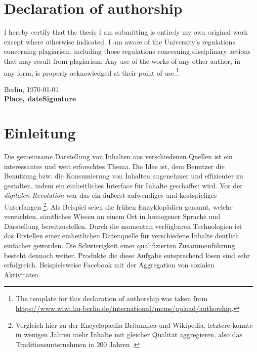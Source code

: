 \documentclass[12pt,twoside]{book}
\let\cleardoublepage\clearpage
\newcommand\blankpage{%
    \null
    \thispagestyle{empty}%
    \addtocounter{page}{-1}%
    \newpage}
\newcounter{savepage}
\begin{document}


\chapter*{Declaration of authorship}

I hereby certify that the thesis I am submitting is entirely my own original work except where otherwise indicated. I am aware of the University's regulations concerning plagiarism, including those regulations concerning disciplinary actions that may result from plagiarism. Any use of the works of any other author, in any form, is properly acknowledged at their point of use.\footnote{The template for this declaration of authorship was taken from \url{https://www.wiwi.hu-berlin.de/international/mems/upload/authorship}.}

\vspace{2cm}

Berlin, \today\\
\textbf{Place, date}\hfill\textbf{Signature}
\cleardoublepage

\tableofcontents
\newpage


\chapter{Einleitung}

Die gemeinsame Darstellung von Inhalten aus verschiedenen Quellen ist ein interessantes und weit erforschtes Thema. Die Idee ist, dem Benutzer die Benutzung bzw. die Konsumierung von Inhalten angenehmer und effizienter zu gestalten, indem ein einheitliches Interface für Inhalte geschaffen wird. Vor der \textit{digitalen Revolution} war das ein äußerst aufwendiges und kostspieliges Unterfangen \footnote{Vergleich hier zu der Encyclopædia Britannica
und Wikipedia, letztere konnte in wenigen Jahren mehr Inhalte mit gleicher Qualität aggregieren, also das Traditionsunternehmen in 200 Jahren \cite{giles2005internet}.}. Als Beispiel seien die frühen Enzyklopädien genannt, welche versuchten, sämtliches Wissen an einem Ort in homogener Sprache und Darstellung bereitzustellen. Durch die momentan verfügbaren Technologien ist das Erstellen einer einheitlichen Datenquelle für verschiedene Inhalte deutlich einfacher geworden. Die Schwierigkeit einer qualifizierten Zusammenführung besteht dennoch weiter. Produkte die diese Aufgabe entsprechend lösen sind sehr erfolgreich. Beispielsweise Facebook mit der Aggregation von sozialen Aktivitäten.
\end{document}
